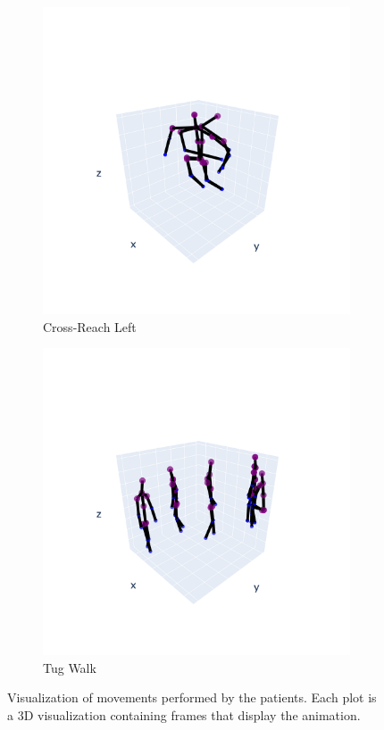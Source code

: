 \begin{figure}[h]
            \begin{subfigure}{.5\textwidth}
                \centering
                \includegraphics[width=.9\linewidth]{../src/resources/plots/movements/mov-2.png}
                \caption{Cross-Reach Left}
                \label{fig:mov-2}
            \end{subfigure}
            \begin{subfigure}{.5\textwidth}
                \centering
                \includegraphics[width=.9\linewidth]{../src/resources/plots/movements/mov-9.png}
                \caption{Tug Walk}
                \label{fig:mov-9}
            \end{subfigure}
            
            \caption{Visualization of movements performed by the patients. Each plot is a 3D visualization containing frames that display the animation.}
            \label{fig:movements_visualization}
        \end{figure}

